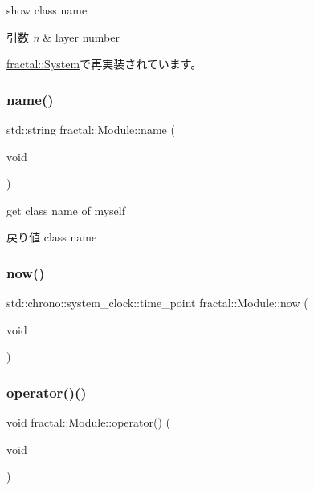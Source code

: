 show class name 


\begin{DoxyParams}{引数}
{\em n} & layer number \\
\hline
\end{DoxyParams}


\hyperlink{classfractal_1_1System_aa8e8768417ccfe745def786d63eee80d}{fractal\+::\+System}で再実装されています。

\mbox{\label{classfractal_1_1Module_a770fab9c6a6f310e76a9c29ed9c7d515}} 
\subsubsection{\texorpdfstring{name()}{name()}}
{\footnotesize\ttfamily std\+::string fractal\+::\+Module\+::name (\begin{DoxyParamCaption}\item[{void}]{ }\end{DoxyParamCaption})\hspace{0.3cm}{\ttfamily [inline]}}



get class name of myself 

\begin{DoxyReturn}{戻り値}
class name 
\end{DoxyReturn}
\mbox{\label{classfractal_1_1Module_a4618e1597d01313ffb69116ed3dcdbfa}} 
\subsubsection{\texorpdfstring{now()}{now()}}
{\footnotesize\ttfamily std\+::chrono\+::system\+\_\+clock\+::time\+\_\+point fractal\+::\+Module\+::now (\begin{DoxyParamCaption}\item[{void}]{ }\end{DoxyParamCaption})\hspace{0.3cm}{\ttfamily [inline]}}

\mbox{\label{classfractal_1_1Module_ae738b02bc66ce9aaf425902bd01b9503}} 
\subsubsection{\texorpdfstring{operator()()}{operator()()}}
{\footnotesize\ttfamily void fractal\+::\+Module\+::operator() (\begin{DoxyParamCaption}\item[{void}]{ }\end{DoxyParamCaption})\hspace{0.3cm}{\ttfamily [inline]}}


